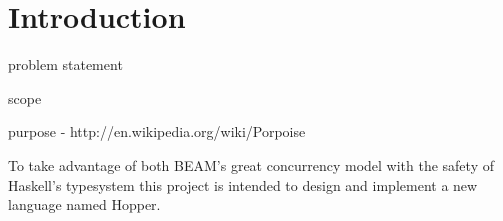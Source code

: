 \chapter{Introduction}



problem statement

scope

purpose - http://en.wikipedia.org/wiki/Porpoise






To take advantage of both BEAM's great concurrency model with the safety of 
Haskell's typesystem this project is intended to design and implement a new 
language named Hopper.  
